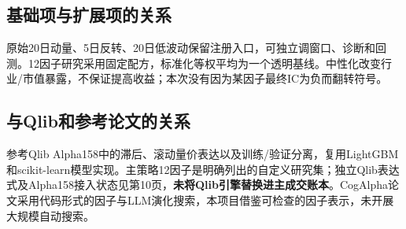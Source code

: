 \documentclass[UTF8,a4paper,10pt]{ctexart}
\begin{document}
\subsection*{基础项与扩展项的关系}
原始20日动量、5日反转、20日低波动保留注册入口，可独立调窗口、诊断和回测。12因子研究采用固定配方，标准化等权平均为一个透明基线。中性化改变行业/市值暴露，不保证提高收益；本次没有因为某因子最终IC为负而翻转符号。
\subsection*{与Qlib和参考论文的关系}
参考Qlib Alpha158中的滞后、滚动量价表达以及训练/验证分离，复用LightGBM和scikit-learn模型实现。主策略12因子是明确列出的自定义研究集；独立Qlib表达式及Alpha158接入状态见第10页，\textbf{未将Qlib引擎替换进主成交账本}。CogAlpha论文采用代码形式的因子与LLM演化搜索，本项目借鉴可检查的因子表示，未开展大规模自动搜索。
\end{document}
